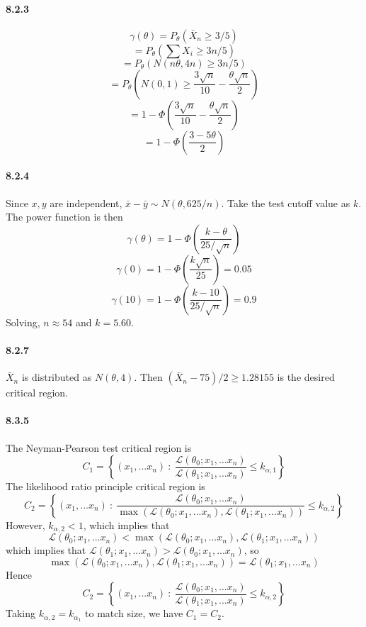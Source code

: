 \documentclass[10pt,letter]{article}
\begin{document}
\paragraph*{8.2.3}
\[ \gamma(\theta) = P_{\theta}(\bar{X}_n \ge 3/5) \]
\[ = P_{\theta}(\sum X_i \ge 3n/5) \]
\[ = P_{\theta}( N(n\theta, 4n) \ge 3n/5) \]
\[ = P_{\theta}\left( N(0, 1) \ge \frac{3\sqrt{n}}{10}- \frac{\theta\sqrt{n}}{2}\right) \]
\[ = 1 - \Phi\left(\frac{3\sqrt{n}}{10}- \frac{\theta\sqrt{n}}{2}\right) \]
\[ = 1 - \Phi\left(\frac{3 - 5\theta}{2}\right) \]
\paragraph*{8.2.4}
Since $x, y$ are independent, $\bar{x} - \bar{y} \sim N(\theta, 625/n)$. Take the test cutoff value as $k$. The power function is then
\[ \gamma(\theta) = 1 - \Phi\left(\frac{k - \theta}{25/\sqrt{n}} \right) \]
\[ \gamma(0) = 1 - \Phi\left(\frac{k\sqrt{n}}{25} \right) = 0.05 \]
\[ \gamma(10) = 1 - \Phi\left(\frac{k-10}{25/\sqrt{n}} \right) = 0.9 \]
Solving, $n \approx 54 $ and $k = 5.60$.
\paragraph*{8.2.7}
$\bar{X}_n$ is distributed as $N(\theta, 4)$. Then $(\bar{X}_n - 75)/2 \ge 1.28155$ is the desired critical region.
\paragraph*{8.3.5}
The Neyman-Pearson test critical region is
\[ C_1 = \left\{(x_1, ... x_n) \ : \ \frac{\mathcal{L}(\theta_0; x_1, ... x_n)}{\mathcal{L}(\theta_1; x_1, ... x_n)} \le k_{\alpha, 1} \right\} \]
The likelihood ratio principle critical region is
\[ C_2 = \left\{(x_1, ... x_n) \ : \ \frac{\mathcal{L}(\theta_0; x_1, ... x_n)}{\max\left(\mathcal{L}(\theta_0; x_1, ... x_n), \mathcal{L}(\theta_1; x_1, ... x_n) \right)} \le k_{\alpha, 2} \right\} \]
However, $k_{\alpha, 2} < 1$, which implies that \[ \mathcal{L}(\theta_0; x_1, ... x_n) < \max\left(\mathcal{L}(\theta_0; x_1, ... x_n), \mathcal{L}(\theta_1; x_1, ... x_n) \right) \]
which implies that $\mathcal{L}(\theta_1; x_1, ... x_n) > \mathcal{L}(\theta_0; x_1, ... x_n)$, so
\[ \max\left(\mathcal{L}(\theta_0; x_1, ... x_n), \mathcal{L}(\theta_1; x_1, ... x_n)\right) = \mathcal{L}(\theta_1; x_1, ... x_n)\]
Hence
\[ C_2 = \left\{(x_1, ... x_n) \ : \ \frac{\mathcal{L}(\theta_0; x_1, ... x_n)}{ \mathcal{L}(\theta_1; x_1, ... x_n)} \le k_{\alpha, 2} \right\} \]
Taking $k_{\alpha, 2} = k_{\alpha_1}$ to match size, we have $C_1 = C_2$.
\end{document}
